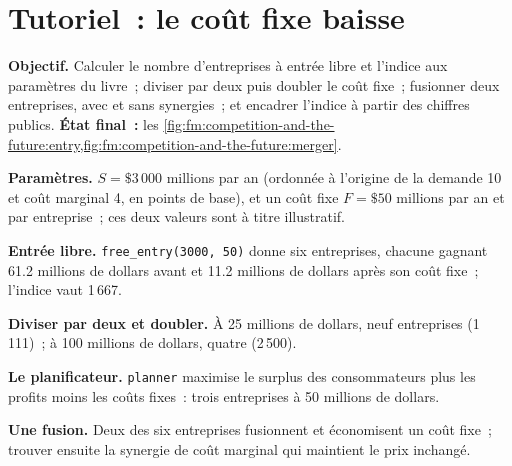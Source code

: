 \section{Tutoriel~: le coût fixe baisse}\label{tut:fm:competition-and-the-future:tut}

\begin{tutorial}
\textbf{Objectif.} Calculer le nombre d'entreprises à entrée libre et l'indice aux paramètres du livre~; diviser par deux puis doubler le coût fixe~; fusionner deux entreprises, avec
et sans synergies~; et encadrer l'indice à partir des chiffres publics. \textbf{État final~:}
les \cref{fig:fm:competition-and-the-future:entry,fig:fm:competition-and-the-future:merger}.
\begin{tutsteps}
\item \textbf{Paramètres.} $S=\$3\,000$ millions par an (ordonnée à l'origine de la demande 10 et coût marginal 4, en points de base), et un coût fixe $F=\$50$ millions
par an et par entreprise~; ces deux valeurs sont à titre illustratif.
\item \textbf{Entrée libre.} \texttt{free\_entry(3000, 50)} donne six entreprises, chacune gagnant 61.2 millions de dollars avant et 11.2 millions de dollars après son coût fixe~;
l'indice vaut 1\,667.
\item \textbf{Diviser par deux et doubler.} À 25 millions de dollars, neuf entreprises (1\,111)~; à 100 millions de dollars, quatre (2\,500).
\item \textbf{Le planificateur.} \texttt{planner} maximise le surplus des consommateurs plus les profits moins les coûts fixes~: trois entreprises à 50 millions de dollars.
\item \textbf{Une fusion.} Deux des six entreprises fusionnent et économisent un coût fixe~; trouver ensuite la synergie de coût marginal qui maintient le prix inchangé.
\end{tutsteps}
\end{tutorial}

\label{lst:fm:competition-and-the-future:entry}

